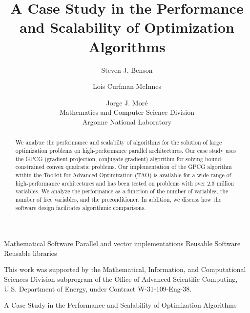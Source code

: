 \documentclass{esub2acm}
\begin{document}





\title{A Case Study in the Performance and Scalability of
Optimization Algorithms\footnotemark}

\author{Steven J. Benson
\and
Lois Curfman McInnes
\and
Jorge J. Mor\'e \\
Mathematics and Computer Science Division \\
Argonne National Laboratory
}

\begin{abstract}
We analyze the performance and scalabilty of algorithms for the
solution of large optimization problems on 
high-performance parallel architectures.
Our case study uses the GPCG (gradient projection, conjugate gradient) algorithm
for solving bound-constrained convex quadratic problems.
Our implementation of the GPCG algorithm within the Toolkit for 
Advanced Optimization (TAO) is available
for a wide range of high-performance architectures
and has been tested on problems with over 2.5 million variables.
We analyze the performance as a function of the number of variables, 
the number of
free variables, and the preconditioner.
In addition, we discuss how the software
design facilitates algorithmic comparisons.
\end{abstract}


 {Mathematical Software} {Parallel and vector implementations}
 {Reusable Software} {Reusable libraries}
\keywords{}
\begin{bottomstuff}
This work was supported by the Mathematical, Information, and
Computational Sciences Division subprogram of the Office of Advanced
Scientific Computing, U.S. Department of Energy, under Contract
W-31-109-Eng-38.
\begin{authinfo}
\end{authinfo}
\permission
\end{bottomstuff}
     {A Case Study in the Performance and Scalability of
Optimization Algorithms}
\maketitle











%
\end{document}

